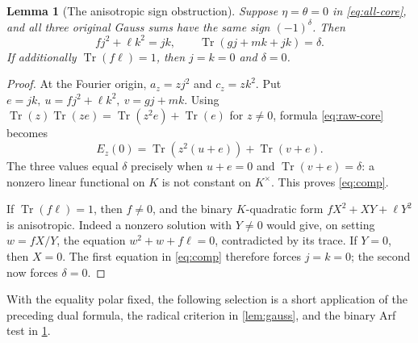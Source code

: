 \documentclass[11pt,a4paper]{article}
\newtheorem{lemma}[theorem]{Lemma}
\theoremstyle{definition}
\theoremstyle{remark}
\numberwithin{equation}{section}
\newcommand{\Tr}{\operatorname{Tr}}
\begin{document}
\begin{lemma}[The anisotropic sign obstruction]\label{lem:obstruction}
Suppose \(\eta=\theta=0\) in \eqref{eq:all-core}, and all three
original Gauss sums have the same sign \((-1)^\delta\).
Then
\begin{equation}\label{eq:comp}
 fj^2+\ell k^2=jk,\qquad \Tr(gj+mk+jk)=\delta.
\end{equation}
If additionally \(\Tr(f\ell)=1\), then \(j=k=0\) and \(\delta=0\).
\end{lemma}
\begin{proof}
At the Fourier origin, \(a_z=zj^2\) and \(c_z=zk^2\).
Put \(e=jk,\ u=fj^2+\ell k^2,\ v=gj+mk\).
Using
\(\Tr(z)\Tr(ze)=\Tr(z^2e)+\Tr(e)\) for \(z\ne0\), formula
\eqref{eq:raw-core} becomes
\[
 E_z(0)=\Tr(z^2(u+e))+\Tr(v+e).
\]
The three values equal \(\delta\) precisely when \(u+e=0\) and
\(\Tr(v+e)=\delta\): a nonzero linear functional on \(K\) is not
constant on \(K^\times\).
This proves \eqref{eq:comp}.

If \(\Tr(f\ell)=1\), then \(f\ne0\), and the binary \(K\)-quadratic
form \(fX^2+XY+\ell Y^2\) is anisotropic.
Indeed a nonzero solution with \(Y\ne0\) would give, on setting
\(w=fX/Y\), the equation \(w^2+w+f\ell=0\), contradicted by its trace.
If \(Y=0\), then \(X=0\).
The first equation in \eqref{eq:comp} therefore forces \(j=k=0\);
the second now forces \(\delta=0\).
\end{proof}

With the equality polar fixed, the following selection is a short
application of the preceding dual formula, the radical criterion in
\cref{lem:gauss}, and the binary Arf test in \cref{lem:obstruction}.
\end{document}
